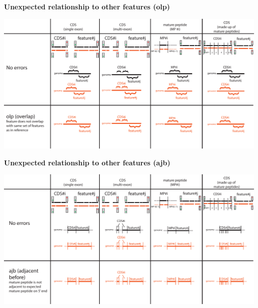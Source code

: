 \documentclass[landscape]{slides}
\begin{document}
\begin{slide}
\begin{center}
\textbf{Unexpected relationship to other features (olp)}
\vspace{0.5in}

\includegraphics[width=10in]{figs/error-5-olp}
\end{center}
\vfill
\end{slide}
\begin{slide}
\begin{center}
\textbf{Unexpected relationship to other features (ajb)}
\vspace{0.5in}

\includegraphics[width=10in]{figs/error-6-ajb}
\end{center}
\vfill
\end{slide}
\end{document}
